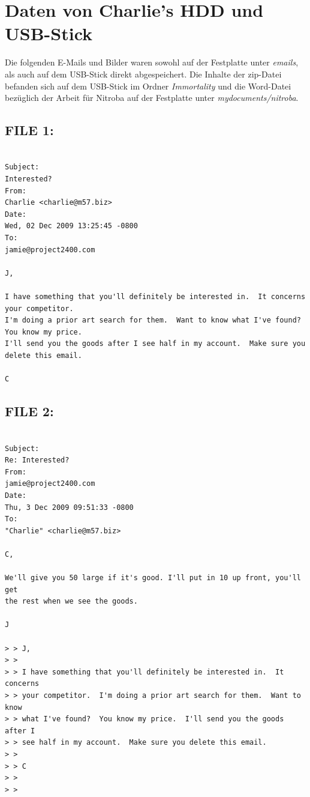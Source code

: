 \section{Daten von Charlie's HDD und USB-Stick}
\label{sec:charlie_daten}

Die folgenden E-Mails und Bilder waren sowohl auf der Festplatte unter \textit{emails}, als auch auf dem USB-Stick direkt abgespeichert. Die Inhalte der zip-Datei befanden sich auf dem USB-Stick im Ordner \textit{Immortality} und die Word-Datei bezüglich der Arbeit für Nitroba auf der Festplatte unter \textit{mydocuments/nitroba}.

\subsection{FILE 1:}
\label{sec:charlie_daten_1}

\begin{lstlisting}

Subject:
Interested?
From:
Charlie <charlie@m57.biz>
Date:
Wed, 02 Dec 2009 13:25:45 -0800
To:
jamie@project2400.com

J,

I have something that you'll definitely be interested in.  It concerns your competitor.  
I'm doing a prior art search for them.  Want to know what I've found?  You know my price.  
I'll send you the goods after I see half in my account.  Make sure you delete this email.

C

\end{lstlisting}

\subsection{FILE 2:}
\label{sec:charlie_daten_2}

\begin{lstlisting}

Subject:
Re: Interested?
From:
jamie@project2400.com
Date:
Thu, 3 Dec 2009 09:51:33 -0800
To:
"Charlie" <charlie@m57.biz>

C,

We'll give you 50 large if it's good. I'll put in 10 up front, you'll get
the rest when we see the goods.

J

> > J,
> >
> > I have something that you'll definitely be interested in.  It concerns
> > your competitor.  I'm doing a prior art search for them.  Want to know
> > what I've found?  You know my price.  I'll send you the goods after I
> > see half in my account.  Make sure you delete this email.
> >
> > C
> >
> >

\end{lstlisting}


